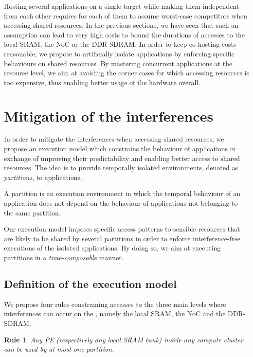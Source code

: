 \documentclass[main.tex]{subfiles}
\begin{document}
Hosting several applications on a single target while making them independent
from each other requires for each of them to assume worst-case competitors when
accessing shared resources. In the previous sections, we have seen that such an
assumption can lead to very high costs to bound the durations of accesses to
the local SRAM, the NoC or the DDR-SDRAM. In order to keep co-hosting costs
reasonable, we propose to artificially isolate applications by enforcing
specific behaviours on shared resources. By mastering concurrent applications
at the resource level, we aim at avoiding the corner cases for which accessing
resources is too expensive, thus enabling better usage of the hardware overall.


\section{Mitigation of the interferences}

In order to mitigate the interferences when accessing shared resources, we
propose an execution model which constrains the behaviour of applications in
exchange of improving their predictability and enabling better access to shared
resources. The idea is to provide temporally isolated environments, denoted as
\emph{partitions}, to applications. 

\begin{definition}[Partition]
A partition is an execution environment in which the temporal behaviour of an
    application does not depend on the behaviour of applications not belonging
    to the same partition. 
\end{definition}

Our execution model imposes specific access patterns to sensible resources that
are likely to be shared by several partitions in order to enforce
interference-free executions of the isolated applications. By doing so, we aim
at executing partitions in a \emph{time-composable} manner.


\subsection{Definition of the execution model}
We propose four rules constraining accesses to the three main levels where
interferences can occur on the \mppalong, namely the local SRAM, the NoC and
the DDR-SDRAM.

\newtheorem{emrule}{Rule}
\begin{emrule}
    Any PE (respectively any local SRAM bank) inside any compute cluster can be
    used by at most one partition.  \label{emrule_1}
\end{emrule}
\end{document}
